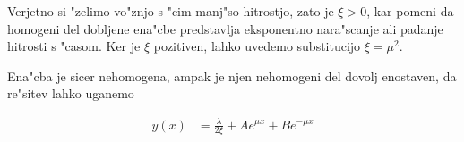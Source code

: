 \documentclass[12pt]{article}
\begin{document}
Verjetno si "zelimo vo"znjo s "cim manj"so hitrostjo, zato je $\xi > 0$, kar pomeni da homogeni del dobljene ena"cbe predstavlja eksponentno nara"scanje ali padanje hitrosti s "casom. Ker je $\xi$ pozitiven, lahko uvedemo substitucijo $\xi = \mu^2$. 

\begin{comment}


Ker je ena"cba nehomogena pa sta koeficienta pred obema re"sitvama lahko funkciji $x$, me"sanih odvodov pa se lahko znebimo, saj imamo na voljo eno prostostno stopnjo odve"c. 

\begin{align}
  y(x) &= A(x) e^ {\mu x} + B(x) e^{-\mu x} \\
  y'(x) &= A'(x) e^{\mu x} + A(x)\mu e^{\mu x} + B'(x) e^{-\mu x} - B(x) \mu e^{-\mu x} \\
  &= A(x)\mu  e^{\mu x} - B(x)\mu  e^{-\mu x} \\
  y''(x) &= A'(x) \mu e^{\mu x} + A(x) \mu^2 e^{\mu x} - B'(x) \mu e^{-\mu x} + B(x) \mu^2 e^{-\mu x} \\
  &= \mu(A'(x) e^{\mu x} - B'(x) e^{-\mu x}) + \xi y(x)
\end{align}

Funkciji $A$ in $B$ zado"s"cata sistemu dveh ena"cb


\begin{align}
  A'(x) e^{\mu x} + B'(x) e^{-\mu x} &= 0 \\
  A'(x) e^{\mu x} - B'(x) e^{-\mu x} &= \frac{-\lambda}{2\mu}
\end{align}

z re"sitvama

\begin{align}
  A'(x) &= \frac{-\lambda}{4\mu} e^{-\mu x} & A(x) &= \frac{\lambda}{4\xi}e^{-\mu x} + C\\
  B'(x) &= \frac{\lambda}{4\mu} e^{\mu x} & B(x) &= \frac{\lambda}{4\xi}e^{\mu x} + D
\end{align}

\end{comment}

Ena"cba je sicer nehomogena, ampak je njen nehomogeni del dovolj enostaven, da re"sitev lahko uganemo

\begin{align}
  y(x) &= \frac{\lambda}{2\xi} + A e^{\mu x} + B e^{-\mu x}
\end{align}
\end{document}
